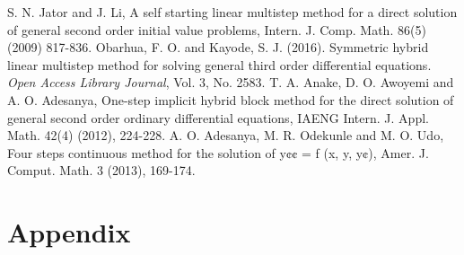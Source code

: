 \documentclass[12pt]{article}
\begin{document}
\begin{thebibliography}{99}
	S. N. Jator and J. Li, A self starting linear multistep method for a direct solution of general second order initial value problems, Intern. J. Comp. Math. 86(5) (2009) 817-836.
	Obarhua, F. O. and Kayode, S. J. (2016). Symmetric hybrid linear multistep method for solving general third order differential equations. \textit{Open Access Library Journal}, Vol. 3, No. 2583.
	T. A. Anake, D. O. Awoyemi and A. O. Adesanya, One-step implicit hybrid block method for the direct solution of general second order ordinary differential equations, IAENG Intern. J. Appl. Math. 42(4) (2012), 224-228.
	A. O. Adesanya, M. R. Odekunle and M. O. Udo, Four steps continuous method for the solution of y¢¢ = f (x, y, y¢), Amer. J. Comput. Math. 3 (2013), 169-174.
\end{thebibliography}



\cleardoublepage
\section{Appendix}
\end{document}
